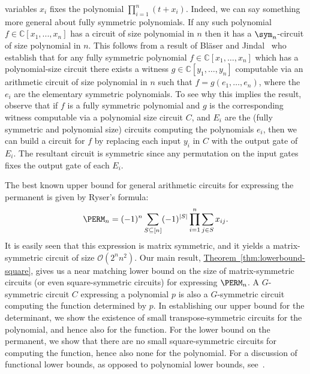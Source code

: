 \documentclass[11pt]{article}
\newcommand{\expref}[2]{\texorpdfstring{\hyperref[#2]{#1~\ref{#2}}}{#1~\ref{#2}}}
\begin{document}
variables $x_i$ fixes the polynomial $\prod_{i=1}^n (t+x_i)$.
Indeed, we can say something more general about fully symmetric
polynomials.  If any such polynomial $f\in \mathbb{C}[x_1,...,x_n]$ has a circuit of
size polynomial in $n$ then it has a $\sym_n$-circuit of size polynomial in $n$. 
This follows from a result of Bl\"{a}ser and
Jindal~\cite{BlaeserJ19} who establish that for any fully symmetric
polynomial $f \in \mathbb{C}[x_1, \ldots, x_n]$ which has a
polynomial-size circuit there exists a witness
$g\in \mathbb{C}[y_1, \ldots, y_n]$ computable via an arithmetic
circuit of size polynomial in $n$ such that $f = g(e_1, \ldots, e_n)$,
where the %
%
%
$e_i$  %
are the elementary symmetric polynomials.   To see
why this implies the result, observe that if $f$ is a fully symmetric
polynomial and $g$ is the corresponding witness computable via a
polynomial size circuit $C$, and $E_i$ are the (fully symmetric and
polynomial size) circuits computing the polynomials $e_i$, then we can
build a circuit for $f$ by replacing each input $y_i$ in $C$ with the
output gate of $E_i$. The resultant circuit is symmetric since any
permutation on the input gates fixes the output gate of each $E_i$. 
 
The best known upper bound for general arithmetic circuits for expressing the
permanent is given by Ryser's formula:
$$\PERM_n  = (-1)^n \sum_{S \subseteq [n]} (-1)^{|S|} \prod_{i=1}^n
\sum_{j\in S} x_{ij}.$$ It is easily seen that this expression is matrix symmetric, and
it yields a matrix-symmetric circuit of size $\mathcal{O}(2^{n}n^2)$.  Our main result,
\expref{Theorem}{thm:lowerbound-square}, gives us a near matching lower bound on the size of matrix-symmetric circuits (or even square-symmetric circuits) for expressing $\PERM_n$.
A $G$-symmetric circuit $C$ expressing a polynomial $p$ is also a
$G$-symmetric circuit computing the function determined by $p$. In establishing our
upper bound for the determinant, we show the existence of small transpose-symmetric
circuits for the polynomial, and hence also for the function. For the lower
bound on the permanent, we show that there are no small square-symmetric circuits for
computing the function, hence also none for the polynomial. For a discussion of
functional lower bounds, as opposed to polynomial lower bounds,
see~\cite{ForbesKS16}.
%
\end{document}
